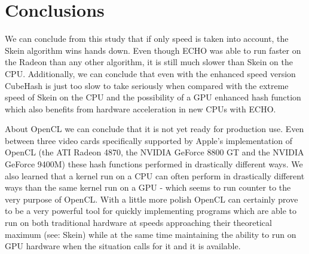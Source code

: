 \section*{Conclusions}

We can conclude from this study that if only speed is taken into account, the Skein algorithm wins hands down.
Even though ECHO was able to run faster on the Radeon than any other algorithm, it is still much slower than Skein on the CPU.
Additionally, we can conclude that even with the enhanced speed version CubeHash is just too slow to take seriously when compared with the extreme speed of Skein on the CPU and the possibility of a GPU enhanced hash function which also benefits from hardware acceleration in new CPUs with ECHO.

About OpenCL we can conclude that it is not yet ready for production use.
Even between three video cards specifically supported by Apple's implementation of OpenCL (the ATI Radeon 4870, the NVIDIA GeForce 8800 GT and the NVIDIA GeForce 9400M) these hash functions performed in drastically different ways.
We also learned that a kernel run on a CPU can often perform in drastically different ways than the same kernel run on a GPU - which seems to run counter to the very purpose of OpenCL.
With a little more polish OpenCL can certainly prove to be a very powerful tool for quickly implementing programs which are able to run on both traditional hardware at speeds approaching their theoretical maximum (see: Skein) while at the same time maintaining the ability to run on GPU hardware when the situation calls for it and it is available.